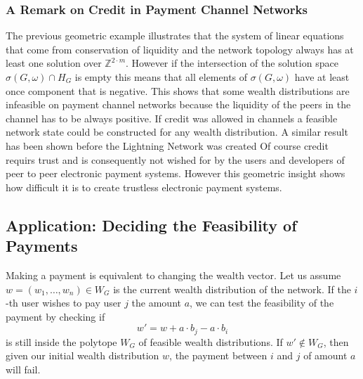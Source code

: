 \documentclass[10pt,twocolumn]{article}
\begin{document}
\subsubsection{A Remark on Credit in Payment Channel Networks}
\label{sec:credit}
The previous geometric example illustrates that the system of linear equations that come from conservation of liquidity and the network topology always has at least one solution over $\mathbb{Z}^{2\cdot m}$.
However if the intersection of the solution space \(\sigma(G,\omega) \cap H_G\) is empty this means that all elements of $\sigma(G,\omega)$ have at least once component that is negative. 
This shows that some wealth distributions are infeasible on payment channel networks because the liquidity of the peers in the channel has to be always positive.
If credit was allowed in channels a feasible network state could be constructed for any wealth distribution.
A similar result has been shown before the Lightning Network was created \cite{dandekar2011liquidity}
Of course credit requirs trust and is consequently not wished for by the users and developers of peer to peer electronic payment systems.
However this geometric insight shows how difficult it is to create trustless electronic payment systems.


\subsection{Application: Deciding the Feasibility of Payments}


Making a payment is equivalent to changing the wealth vector.  
Let us assume \( w = (w_1, \dots, w_n) \in W_G \) is the current wealth distribution of the network.  
If the \( i \)-th user wishes to pay user \( j \) the amount \( a \), we can test the feasibility of the payment by checking if  
\begin{equation}
  \label{eq:payment}
  w' = w + a \cdot b_j - a \cdot b_i
\end{equation}
is still inside the polytope \( W_G \) of feasible wealth distributions.  
If \( w' \notin W_G \), then given our initial wealth distribution \( w \), the payment between \( i \) and \( j \) of amount \( a \) will fail.  
\end{document}
